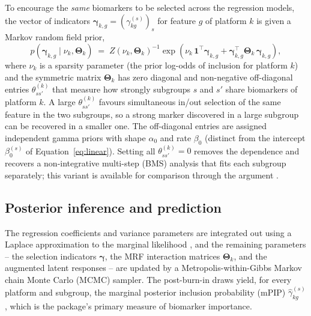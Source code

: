 \documentclass[article]{jss}
\begin{document}
To encourage the \emph{same} biomarkers to be selected across the regression
models, the vector of indicators
$\bm{\gamma}_{k,g}=(\gamma^{(s)}_{kg})_{s}$ for feature $g$ of platform $k$ is
given a Markov random field prior,
%
\begin{equation}\label{eq:mrf}
  p\!\left(\bm{\gamma}_{k,g}\mid\nu_k,\bm{\Theta}_k\right)
  \;=\; Z(\nu_k,\bm{\Theta}_k)^{-1}
  \exp\!\left(\nu_k\,\bm{1}^{\top}\bm{\gamma}_{k,g}
  + \bm{\gamma}_{k,g}^{\top}\bm{\Theta}_k\,\bm{\gamma}_{k,g}\right),
\end{equation}
%
where $\nu_k$ is a sparsity parameter (the prior log-odds of inclusion for
platform $k$) and the symmetric matrix $\bm{\Theta}_k$ has zero diagonal and
non-negative off-diagonal entries $\theta^{(k)}_{ss'}$ that measure how strongly
subgroups $s$ and $s'$ share biomarkers of platform $k$. A large
$\theta^{(k)}_{ss'}$ favours simultaneous in/out selection of the same feature in
the two subgroups, so a strong marker discovered in a large subgroup can be
recovered in a smaller one. The off-diagonal entries are assigned independent
gamma priors with shape $\alpha_0$ and rate $\beta_0$ (distinct from the
intercept $\beta_0^{(s)}$ of Equation~\ref{eq:linear}). Setting all
$\theta^{(k)}_{ss'}=0$ removes the dependence and recovers a non-integrative
 multi-step (BMS) analysis that fits each subgroup
separately; this variant is available for comparison through the argument
.

\subsection{Posterior inference and prediction}\label{sec:inference}

The regression coefficients and variance parameters are integrated out using a
Laplace approximation to the marginal likelihood \citep{johnson2012}, and the
remaining parameters -- the selection indicators $\bm{\gamma}$, the MRF
interaction matrices $\bm{\Theta}_k$, and the augmented latent responses -- are
updated by a Metropolis-within-Gibbs Markov chain Monte Carlo (MCMC) sampler.
The post-burn-in draws yield, for every platform and subgroup, the marginal
posterior inclusion probability (mPIP) $\hat\gamma^{(s)}_{kg}$, which is the
package's primary measure of biomarker importance.
\end{document}
